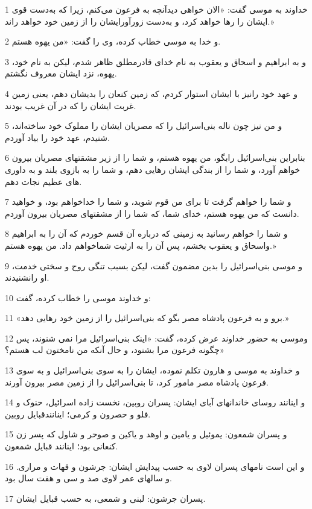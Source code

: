 \par 1 خداوند به موسی گفت: «الان خواهی دیدآنچه به فرعون می‌کنم، زیرا که به‌دست قوی ایشان را رها خواهد کرد، و به‌دست زورآورایشان را از زمین خود خواهد راند.»
\par 2 و خدا به موسی خطاب کرده، وی را گفت: «من یهوه هستم.
\par 3 و به ابراهیم و اسحاق و یعقوب به نام خدای قادرمطلق ظاهر شدم، لیکن به نام خود، یهوه، نزد ایشان معروف نگشتم.
\par 4 و عهد خود رانیز با ایشان استوار کردم، که زمین کنعان را بدیشان دهم، یعنی زمین غربت ایشان را که در آن غریب بودند.
\par 5 و من نیز چون ناله بنی‌اسرائیل را که مصریان ایشان را مملوک خود ساخته‌اند، شنیدم، عهد خود را بیاد آوردم.
\par 6 بنابراین بنی‌اسرائیل رابگو، من یهوه هستم، و شما را از زیر مشقتهای مصریان بیرون خواهم آورد، و شما را از بندگی ایشان رهایی دهم، و شما را به بازوی بلند و به داوری های عظیم نجات دهم.
\par 7 و شما را خواهم گرفت تا برای من قوم شوید، و شما را خداخواهم بود، و خواهید دانست که من یهوه هستم، خدای شما، که شما را از مشقتهای مصریان بیرون آوردم.
\par 8 و شما را خواهم رسانید به زمینی که درباره آن قسم خوردم که آن را به ابراهیم واسحاق و یعقوب بخشم، پس آن را به ارثیت شماخواهم داد. من یهوه هستم.»
\par 9 و موسی بنی‌اسرائیل را بدین مضمون گفت، لیکن بسبب تنگی روح و سختی خدمت، او رانشنیدند.
\par 10 و خداوند موسی را خطاب کرده، گفت:
\par 11 «برو و به فرعون پادشاه مصر بگو که بنی‌اسرائیل را از زمین خود رهایی دهد.»
\par 12 وموسی به حضور خداوند عرض کرده، گفت: «اینک بنی‌اسرائیل مرا نمی شنوند، پس چگونه فرعون مرا بشنود، و حال آنکه من نامختون لب هستم؟»
\par 13 و خداوند به موسی و هارون تکلم نموده، ایشان را به سوی بنی‌اسرائیل و به سوی فرعون پادشاه مصر مامور کرد، تا بنی‌اسرائیل را از زمین مصر بیرون آورند.
\par 14 و اینانند روسای خاندانهای آبای ایشان: پسران روبین، نخست زاده اسرائیل، حنوک و فلو و حصرون و کرمی؛ اینانندقبایل روبین.
\par 15 و پسران شمعون: یموئیل و یامین و اوهد و یاکین و صوحر و شاول که پسر زن کنعانی بود؛ اینانند قبایل شمعون.
\par 16 و این است نامهای پسران لاوی به حسب پیدایش ایشان: جرشون و قهات و مراری. و سالهای عمر لاوی صد و سی و هفت سال بود.
\par 17 پسران جرشون: لبنی و شمعی، به حسب قبایل ایشان.

